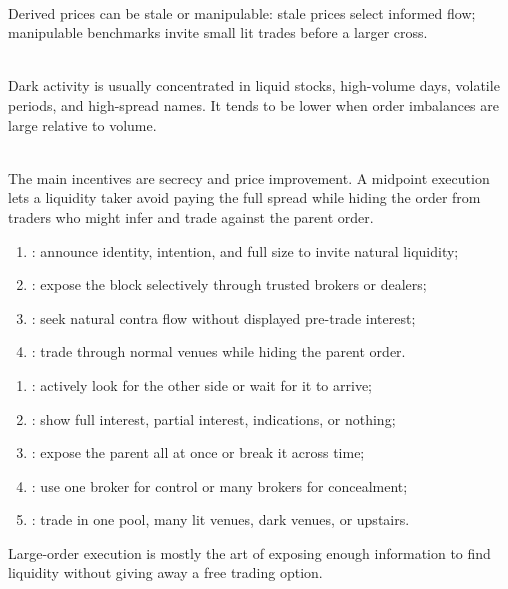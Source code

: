 \documentclass[a4paper,oneside,openany]{book}
\begin{document}
\begin{caveat} \\
Derived prices can be stale or manipulable: stale prices select informed flow; manipulable benchmarks invite small lit trades before a larger cross.
\end{caveat}

\begin{empiricalfinding} \\
Dark activity is usually concentrated in liquid stocks, high-volume days, volatile periods, and high-spread names. It tends to be lower when order imbalances are large relative to volume.
\end{empiricalfinding}

\begin{mechanism} \\
The main incentives are secrecy and price improvement. A midpoint execution lets a liquidity taker avoid paying the full spread while hiding the order from traders who might infer and trade against the parent order.
\end{mechanism}

\begin{taxonomy} 
\begin{enumerate}[label=\roman*.]
\setlength{\itemsep}{0pt}
\item {}: announce identity, intention, and full size to invite natural liquidity;
\item {}: expose the block selectively through trusted brokers or dealers;
\item {}: seek natural contra flow without displayed pre-trade interest;
\item {}: trade through normal venues while hiding the parent order.
\end{enumerate}
\end{taxonomy}

\begin{taxonomy} 
\begin{enumerate}[label=\roman*.]
\setlength{\itemsep}{0pt}
\item {}: actively look for the other side or wait for it to arrive;
\item {}: show full interest, partial interest, indications, or nothing;
\item {}: expose the parent all at once or break it across time;
\item {}: use one broker for control or many brokers for concealment;
\item {}: trade in one pool, many lit venues, dark venues, or upstairs.
\end{enumerate}
Large-order execution is mostly the art of exposing enough information to find liquidity without giving away a free trading option.
\end{taxonomy}
\end{document}
